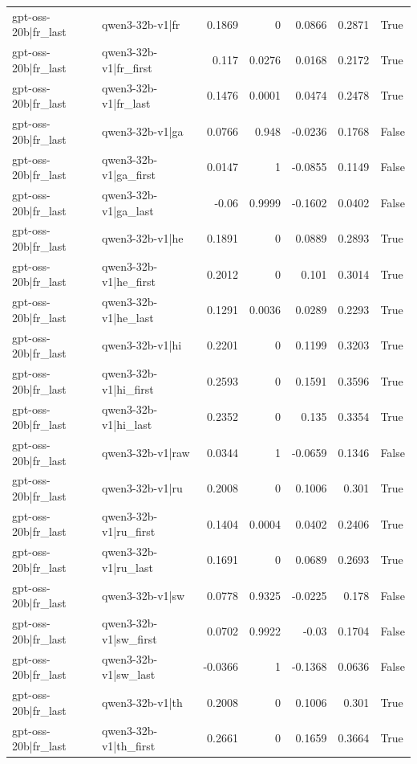\begin{table}
\begin{tabular}{l l r r r r l}
gpt-oss-20b|fr_last & qwen3-32b-v1|fr & 0.1869 & 0 & 0.0866 & 0.2871 & True \\
gpt-oss-20b|fr_last & qwen3-32b-v1|fr_first & 0.117 & 0.0276 & 0.0168 & 0.2172 & True \\
gpt-oss-20b|fr_last & qwen3-32b-v1|fr_last & 0.1476 & 0.0001 & 0.0474 & 0.2478 & True \\
gpt-oss-20b|fr_last & qwen3-32b-v1|ga & 0.0766 & 0.948 & -0.0236 & 0.1768 & False \\
gpt-oss-20b|fr_last & qwen3-32b-v1|ga_first & 0.0147 & 1 & -0.0855 & 0.1149 & False \\
gpt-oss-20b|fr_last & qwen3-32b-v1|ga_last & -0.06 & 0.9999 & -0.1602 & 0.0402 & False \\
gpt-oss-20b|fr_last & qwen3-32b-v1|he & 0.1891 & 0 & 0.0889 & 0.2893 & True \\
gpt-oss-20b|fr_last & qwen3-32b-v1|he_first & 0.2012 & 0 & 0.101 & 0.3014 & True \\
gpt-oss-20b|fr_last & qwen3-32b-v1|he_last & 0.1291 & 0.0036 & 0.0289 & 0.2293 & True \\
gpt-oss-20b|fr_last & qwen3-32b-v1|hi & 0.2201 & 0 & 0.1199 & 0.3203 & True \\
gpt-oss-20b|fr_last & qwen3-32b-v1|hi_first & 0.2593 & 0 & 0.1591 & 0.3596 & True \\
gpt-oss-20b|fr_last & qwen3-32b-v1|hi_last & 0.2352 & 0 & 0.135 & 0.3354 & True \\
gpt-oss-20b|fr_last & qwen3-32b-v1|raw & 0.0344 & 1 & -0.0659 & 0.1346 & False \\
gpt-oss-20b|fr_last & qwen3-32b-v1|ru & 0.2008 & 0 & 0.1006 & 0.301 & True \\
gpt-oss-20b|fr_last & qwen3-32b-v1|ru_first & 0.1404 & 0.0004 & 0.0402 & 0.2406 & True \\
gpt-oss-20b|fr_last & qwen3-32b-v1|ru_last & 0.1691 & 0 & 0.0689 & 0.2693 & True \\
gpt-oss-20b|fr_last & qwen3-32b-v1|sw & 0.0778 & 0.9325 & -0.0225 & 0.178 & False \\
gpt-oss-20b|fr_last & qwen3-32b-v1|sw_first & 0.0702 & 0.9922 & -0.03 & 0.1704 & False \\
gpt-oss-20b|fr_last & qwen3-32b-v1|sw_last & -0.0366 & 1 & -0.1368 & 0.0636 & False \\
gpt-oss-20b|fr_last & qwen3-32b-v1|th & 0.2008 & 0 & 0.1006 & 0.301 & True \\
gpt-oss-20b|fr_last & qwen3-32b-v1|th_first & 0.2661 & 0 & 0.1659 & 0.3664 & True \\

\end{tabular}
\end{table}

